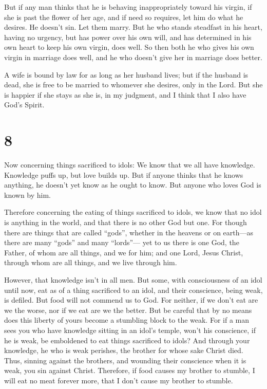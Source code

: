  But if any man thinks that he is behaving
inappropriately toward his virgin, if she is past the flower of her age,
and if need so requires, let him do what he desires. He doesn't sin. Let
them marry.  But he who stands steadfast in his heart,
having no urgency, but has power over his own will, and has determined
in his own heart to keep his own virgin, does well.  So
then both he who gives his own virgin in marriage does well, and he who
doesn't give her in marriage does better.

 A wife is bound by law for as long as her husband lives;
but if the husband is dead, she is free to be married to whomever she
desires, only in the Lord.  But she is happier if she
stays as she is, in my judgment, and I think that I also have God's
Spirit.

\hypertarget{section-7}{%
\section{8}\label{section-7}}

 Now concerning things sacrificed to idols: We know that
we all have knowledge. Knowledge puffs up, but love builds up.
 But if anyone thinks that he knows anything, he doesn't
yet know as he ought to know.  But anyone who loves God is
known by him.

 Therefore concerning the eating of things sacrificed to
idols, we know that no idol is anything in the world, and that there is
no other God but one.  For though there are things that
are called ``gods'', whether in the heavens or on earth---as there are
many ``gods'' and many ``lords''---  yet to us there is
one God, the Father, of whom are all things, and we for him; and one
Lord, Jesus Christ, through whom are all things, and we live through
him.

 However, that knowledge isn't in all men. But some, with
consciousness of an idol until now, eat as of a thing sacrificed to an
idol, and their conscience, being weak, is defiled.  But
food will not commend us to God. For neither, if we don't eat are we the
worse, nor if we eat are we the better.  But be careful
that by no means does this liberty of yours become a stumbling block to
the weak.  For if a man sees you who have knowledge
sitting in an idol's temple, won't his conscience, if he is weak, be
emboldened to eat things sacrificed to idols?  And
through your knowledge, he who is weak perishes, the brother for whose
sake Christ died.  Thus, sinning against the brothers,
and wounding their conscience when it is weak, you sin against Christ.
 Therefore, if food causes my brother to stumble, I will
eat no meat forever more, that I don't cause my brother to stumble.

